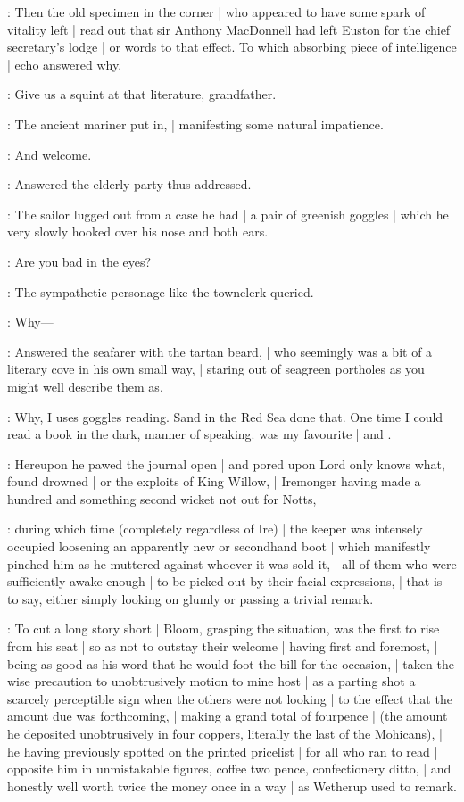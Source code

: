:
Then the old specimen in the corner |
who appeared to have some spark of vitality left |
read out that sir Anthony MacDonnell
had left Euston for the chief secretary's lodge |
or words to that effect.
To which absorbing piece of intelligence |
echo answered why.

\Murphy:
Give us a squint at that literature, grandfather.

:
The ancient mariner put in, |
manifesting some natural impatience.

\OldSpecimen:
And welcome.

:
Answered the elderly party thus addressed.

:
The sailor lugged out from a case he had |
a pair of greenish goggles |
which he very slowly hooked over his nose and both ears.

\Campbell:
Are you bad in the eyes?

:
The sympathetic personage like the townclerk queried.

\Murphy:
Why---

:
Answered the seafarer with the tartan beard, |
who seemingly was a bit of a literary cove in his own small way, |
staring out of seagreen portholes as you might well describe them as.

\Murphy:
Why, I uses goggles reading.
Sand in the Red Sea done that.
One time I could read a book in the dark, manner of speaking.
 was my favourite |
and .

:
Hereupon he pawed the journal open |
and pored upon Lord only knows what, found drowned |
or the exploits of King Willow, |
Iremonger having made a hundred and something second wicket not out for Notts,

:
during which time (completely regardless of Ire) |
the keeper was intensely occupied loosening an apparently new or secondhand boot |
which manifestly pinched him as he muttered against whoever it was sold it, |
all of them who were sufficiently awake enough |
to be picked out by their facial expressions, |
that is to say, either simply looking on glumly or passing a trivial remark.

:
To cut a long story short |
Bloom, grasping the situation, was the first to rise from his seat |
so as not to outstay their welcome |
having first and foremost, |
being as good as his word that he would foot the bill for the occasion, |
taken the wise precaution to unobtrusively motion to mine host |
as a parting shot a scarcely perceptible sign when the others were not looking |
to the effect that the amount due was forthcoming, |
making a grand total of fourpence |
(the amount he deposited unobtrusively in four coppers, literally the last of the Mohicans), |
he having previously spotted on the printed pricelist |
for all who ran to read |
opposite him in unmistakable figures, coffee two pence, confectionery ditto, |
and honestly well worth twice the money once in a way |
as Wetherup used to remark.

